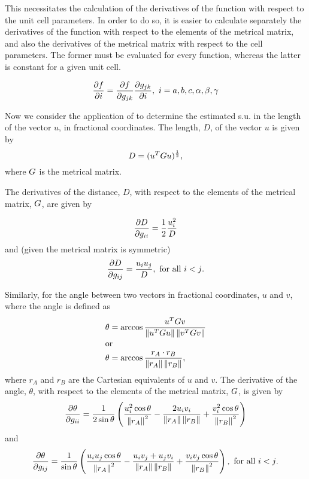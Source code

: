 \documentclass[pdf]{iucr}
\begin{document}
This necessitates the calculation of the derivatives of the function with respect to the unit cell parameters. In order to do so, it is easier to calculate separately the derivatives of the function with respect to the elements of the metrical matrix, and also the derivatives of the metrical matrix with respect to the cell parameters. The former must be evaluated for every function, whereas the latter is constant for a given unit cell.

\begin{equation}
\frac{\partial f}{\partial i} = \frac{\partial f}{\partial g_{jk}}\frac{\partial g_{jk}}{\partial i},\ i=a, b, c, \alpha, \beta, \gamma
\label{eqn:df_dcell}
\end{equation}

Now we consider the application of  to determine the estimated s.u. in the length of the vector $u$, in fractional coordinates. The length, $D$, of the  vector $u$ is given by
\begin{equation}
D = (u^T G u)^\frac{1}{2}
\label{eqn:bond_length},
\end{equation}
where $G$ is the metrical matrix.

The derivatives of the distance, $D$, with respect to the elements of the metrical matrix, $G$, are given by

\begin{equation}
\frac{\partial D}{\partial g_{ii}} = \frac{1}{2} \frac{u_i^2}{D}
\label{eqn:d_distance_d_gii}
\end{equation}
and (given the metrical matrix is symmetric)
\begin{equation}
\frac{\partial D}{\partial g_{ij}} = \frac{u_i u_j}{D},\ \text{for all $i<j$}.
\label{eqn:d_distance_d_gij}
\end{equation}

Similarly, for the angle between two vectors in fractional coordinates, $u$ and $v$, where the angle is defined as
\begin{align}
\theta &= \arccos \frac{u^TGv}{\left\| u^TGu \right\|\left\| v^TGv \right\|} \\
\shortintertext{or}
\theta &= \arccos \frac{r_{A}\cdot r_{B}}{\left\| r_{A} \right\|\left\| r_{B} \right\|}
\label{eqn:angle_cart},
\end{align}
where $r_{A}$ and $r_{B}$ are the Cartesian equivalents of $u$ and $v$. The derivative of the angle, $\theta$, with respect to the elements of the metrical matrix, $G$, is given by
\begin{equation}
\frac{\partial \theta}{\partial g_{ii}} = \frac{1}{2 \sin\theta} \left(\frac{u_i^2 \cos{\theta}}{\left\| r_{A} \right\|^2} - \frac{2 u_i v_i }{\left\| r_{A} \right\|\left\| r_{B} \right\|} +\frac{v_i^2 \cos{\theta}}{\left\| r_{B} \right\|^2}\right)
\label{eqn:d_angle_d_gii}
\end{equation}
and
\begin{equation}
\frac{\partial \theta}{\partial g_{ij}} = \frac{1}{\sin\theta} \left(\frac{u_i u_j \cos{\theta}}{\left\| r_{A} \right\|^2} - \frac{u_i v_j + u_j v_i }{\left\| r_{A} \right\|\left\| r_{B} \right\|} +\frac{v_i v_j \cos{\theta}}{\left\| r_{B} \right\|^2}\right),\ \text{for all $i<j$}.
\label{eqn:d_angle_d_gij}
\end{equation}
\end{document}
